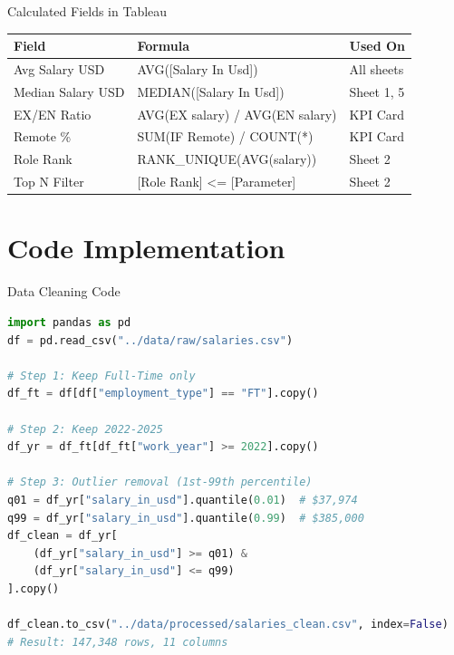 \documentclass[aspectratio=169]{beamer}
\begin{document}
\begin{frame}{Calculated Fields in Tableau}
\footnotesize
\begin{table}
\centering
\begin{tabular}{lll}
\toprule
\textbf{Field} & \textbf{Formula} & \textbf{Used On} \\
\midrule
Avg Salary USD & AVG([Salary In Usd]) & All sheets \\
Median Salary USD & MEDIAN([Salary In Usd]) & Sheet 1, 5 \\
EX/EN Ratio & AVG(EX salary) / AVG(EN salary) & KPI Card \\
Remote \% & SUM(IF Remote) / COUNT(*) & KPI Card \\
Role Rank & RANK\_UNIQUE(AVG(salary)) & Sheet 2 \\
Top N Filter & [Role Rank] <= [Parameter] & Sheet 2 \\
\bottomrule
\end{tabular}
\end{table}
\end{frame}

\section{Code Implementation}

\begin{frame}[fragile]{Data Cleaning Code}
\begin{lstlisting}[language=Python]
import pandas as pd
df = pd.read_csv("../data/raw/salaries.csv")

# Step 1: Keep Full-Time only
df_ft = df[df["employment_type"] == "FT"].copy()

# Step 2: Keep 2022-2025
df_yr = df_ft[df_ft["work_year"] >= 2022].copy()

# Step 3: Outlier removal (1st-99th percentile)
q01 = df_yr["salary_in_usd"].quantile(0.01)  # $37,974
q99 = df_yr["salary_in_usd"].quantile(0.99)  # $385,000
df_clean = df_yr[
    (df_yr["salary_in_usd"] >= q01) &
    (df_yr["salary_in_usd"] <= q99)
].copy()

df_clean.to_csv("../data/processed/salaries_clean.csv", index=False)
# Result: 147,348 rows, 11 columns
\end{lstlisting}
\end{frame}
\end{document}
